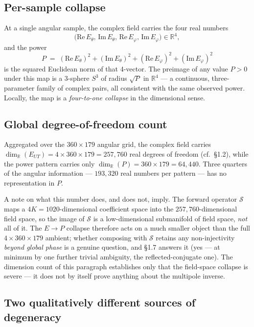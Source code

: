 \documentclass[
  english,
  11pt,
]{report}
\begin{document}
\subsection{Per-sample collapse}\label{per-sample-collapse}

At a single angular sample, the complex field carries the four real
numbers \[
\bigl(\mathrm{Re}\,E_\theta,\,\mathrm{Im}\,E_\theta,\,\mathrm{Re}\,E_\varphi,\,\mathrm{Im}\,E_\varphi\bigr)\in\mathbb{R}^4,
\] and the power \[
P \;=\; (\mathrm{Re}\,E_\theta)^2 + (\mathrm{Im}\,E_\theta)^2 + (\mathrm{Re}\,E_\varphi)^2 + (\mathrm{Im}\,E_\varphi)^2
\] is the squared Euclidean norm of that 4-vector. The preimage of any
value \(P>0\) under this map is a 3-sphere \(S^3\) of radius
\(\sqrt{P}\) in \(\mathbb{R}^4\) --- a continuous, three-parameter
family of complex pairs, all consistent with the same observed power.
Locally, the map is a \emph{four-to-one collapse} in the dimensional
sense.

\subsection{Global degree-of-freedom
count}\label{global-degree-of-freedom-count}

Aggregated over the \(360\times 179\) angular grid, the complex field
carries \(\dim_\mathbb{R}(E_{UT}) = 4\times 360\times 179 = 257{,}760\)
real degrees of freedom (cf.~§1.2), while the power pattern carries only
\(\dim_\mathbb{R}(P) = 360\times 179 = 64{,}440\). Three quarters of the
angular information --- \(193{,}320\) real numbers per pattern --- has
no representation in \(P\).

A note on what this number does, and does not, imply. The forward
operator \(\mathcal S\) maps a \(4K = 1020\)-dimensional coefficient
space into the \(257{,}760\)-dimensional field space, so the image of
\(\mathcal S\) is a low-dimensional submanifold of field space,
\emph{not} all of it. The \(E\to P\) collapse therefore acts on a much
smaller object than the full \(4\times 360\times 179\) ambient; whether
composing with \(\mathcal S\) retains any non-injectivity \emph{beyond
global phase} is a genuine question, and §1.7 answers it (yes --- at
minimum by one further trivial ambiguity, the reflected-conjugate one).
The dimension count of this paragraph establishes only that the
field-space collapse is severe --- it does not by itself prove anything
about the multipole inverse.

\subsection{Two qualitatively different sources of
degeneracy}\label{two-qualitatively-different-sources-of-degeneracy}
\end{document}
